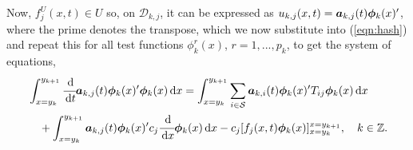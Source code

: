 Now, \(f_j^U(x,t)\in U\) so, on \(\mathcal D_{k,j}\), it can be expressed as \(u_{k,j}(x,t)=\boldsymbol a_{k,j}(t) \boldsymbol \phi_k(x)'{}\), where the prime denotes the transpose, which we now substitute into (\ref{eqn:hash})
and repeat this for all test functions \(\phi^r_k(x)\), \(r=1,...,p_k\), to get the system of equations,
\begin{align}
	\begin{multlined}[t]\int_{x=y_k}^{y_{k+1}}\cfrac{\wrt}{\wrt t} \boldsymbol a_{k,j}(t) \boldsymbol \phi_k(x)\tr{}\boldsymbol \phi_k(x)\wrt x = \int_{x=y_k}^{y_{k+1}}\sum_{i\in\calS} \boldsymbol a_{k,i}(t) \boldsymbol \phi_k(x)\tr{}T_{ij}\boldsymbol\phi_k (x)\wrt x  
	\\{}+  \int_{x=y_k}^{y_{k+1}}\boldsymbol a_{k,j}(t) \boldsymbol \phi_k(x)\tr{}c_j\cfrac{\wrt}{\wrt x}\boldsymbol\phi_k(x)\wrt x - c_j[f_j(x,t) \boldsymbol\phi_k(x)]_{x=y_k}^{x=y_{k+1}},\quad k\in\mathbb Z. \end{multlined} \label{eqn:DG system}
\end{align}

